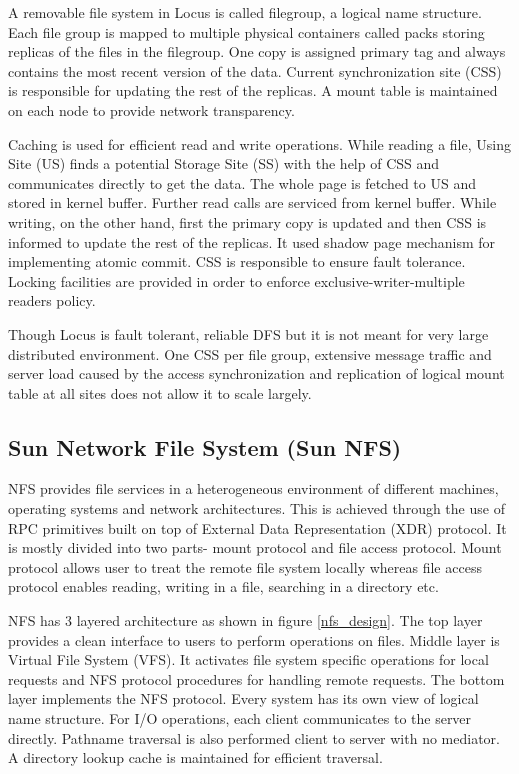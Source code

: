 \documentclass[a4paper,12pt]{article}
\begin{document}
A removable file system in Locus is called filegroup, a logical name structure. Each file group is mapped to multiple physical containers called packs storing replicas of the files in the filegroup. One copy is assigned primary tag and always contains the most recent version of the data. Current synchronization site (CSS) is responsible for updating the rest of the replicas. A mount table is maintained on each node to provide network transparency.

Caching is used for efficient read and write operations. While reading a file, Using Site (US) finds a potential Storage Site (SS) with the help of CSS and communicates directly to get the data. The whole page is fetched to US and stored in kernel buffer. Further read calls are serviced from kernel buffer. While writing, on the other hand, first the primary copy is updated and then CSS is informed to update the rest of the replicas. It used shadow page mechanism for implementing atomic commit. CSS is responsible to ensure fault tolerance. Locking facilities are provided in order to enforce exclusive-writer-multiple readers policy.

Though Locus is fault tolerant, reliable DFS but it is not meant for very large distributed environment. One CSS per file group, extensive message traffic and server load caused by the access synchronization and replication of logical mount table at all sites does not allow it to scale largely.

\subsection{Sun Network File System (Sun NFS) \cite[p.~351]{old_dfs}}
\label{sec:sun_nfs}
NFS provides file services in a heterogeneous environment of different machines, operating systems and network architectures. This is achieved through the use of RPC primitives built on top of External Data Representation (XDR) protocol. It is mostly divided into two parts- mount protocol and file access protocol. Mount protocol allows user to treat the remote file system locally whereas file access protocol enables reading, writing in a file, searching in a directory etc.

NFS has 3 layered architecture as shown in figure \ref{nfs_design}. The top layer provides a clean interface to users to perform operations on files. Middle layer is Virtual File System (VFS). It activates file system specific operations for local requests and NFS protocol procedures for handling remote requests. The bottom layer implements the NFS protocol. Every system has its own view of logical name structure. For I/O operations, each client communicates to the server directly. Pathname traversal is also performed client to server with no mediator. A directory lookup cache is maintained for efficient traversal.
\end{document}
